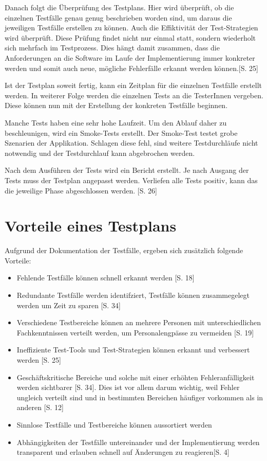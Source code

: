 \documentclass[a4paper,bibtotoc,oneside]{scrbook}
\begin{document}
Danach folgt die Überprüfung des Testplans. Hier wird überprüft, ob die einzelnen Testfälle genau genug beschrieben worden sind, um daraus die jeweiligen Testfälle erstellen zu können. Auch die Effiktivität der Test-Strategien wird überprüft. Diese Prüfung findet nicht nur einmal statt, sondern wiederholt sich mehrfach im Testprozess. Dies hängt damit zusammen, dass die Anforderungen an die Software im Laufe der Implementierung immer konkreter werden und somit auch neue, mögliche Fehlerfälle erkannt werden können.\cite{eval_regression}[S. 25] 

Ist der Testplan soweit fertig, kann ein Zeitplan für die einzelnen Testfälle erstellt werden. In weiterer Folge werden die einzelnen Tests an die TesterInnen vergeben. Diese können nun mit der Erstellung der konkreten Testfälle beginnen.

Manche Tests haben eine sehr hohe Laufzeit. Um den Ablauf daher zu beschleunigen, wird ein Smoke-Tests erstellt. Der Smoke-Test testet grobe Szenarien der Applikation. Schlagen diese fehl, sind weitere Testdurchläufe nicht notwendig und der Testdurchlauf kann abgebrochen werden. 

Nach dem Ausführen der Tests wird ein Bericht erstellt. Je nach Ausgang der Tests muss der Testplan angepasst werden. Verliefen alle Tests positiv, kann das die jeweilige Phase abgeschlossen werden. \cite{eval_regression}[S. 26]


\section{Vorteile eines Testplans}

Aufgrund der Dokumentation der Testfälle, ergeben sich zusätzlich folgende Vorteile:

\begin{itemize}
	\item Fehlende Testfälle können schnell erkannt werden \cite{test_large_systems}[S. 18]
	\item Redundante Testfälle werden identifziert, Testfälle können zusammegelegt werden um Zeit zu sparen \cite{testing_apps_on_web}[S. 34]
	\item Verschiedene Testbereiche können an mehrere Personen mit unterschiedlichen Fachkenntnissen verteilt werden, um Personalengpässe zu vermeiden \cite{test_large_systems}[S. 19]
	\item Ineffiziente Test-Tools und Test-Strategien können erkannt und verbessert werden \cite{eval_regression}[S. 25]
	\item Geschäftskritische Bereiche und solche mit einer erhöhten  Fehleranfälligkeit werden sichtbarer \cite{testing_apps_on_web}[S. 34]. Dies ist vor allem darum wichtig, weil Fehler ungleich verteilt sind und in bestimmten Bereichen häufiger vorkommen als in anderen \cite{eval_regression}[S. 12]
	\item Sinnlose Testfälle und Testbereiche können aussortiert werden 
	\item Abhängigkeiten der Testfälle untereinander und der Implementierung werden transparent und erlauben schnell auf Änderungen zu reagieren\cite{test_auto}[S. 4]
\end{itemize}
\end{document}
